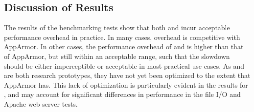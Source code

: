 

\subsection{Discussion of Results}%
\label{ss:eval-performance-discussion}

The results of the benchmarking tests show that both \bpfbox{} and \bpfcontain{} incur
acceptable performance overhead in practice. In many cases, overhead is competitive with
AppArmor. In other cases, the performance overhead of \bpfbox{} and \bpfcontain{} is
higher than that of AppArmor, but still within an acceptable range, such that the slowdown
should be either imperceptible or acceptable in most practical use cases.  As \bpfbox{}
and \bpfcontain{} are both research prototypes, they have not yet been optimized to the
extent that AppArmor has. This lack of optimization is particularly evident in the results
for \bpfcontain{}, and may account for significant differences in performance in the file
I/O and Apache web server tests.

